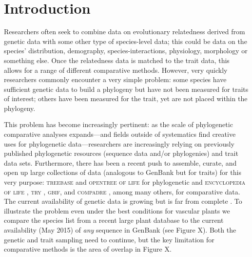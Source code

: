 \documentclass[a4paper,11pt]{article}
\begin{document}
\vfill

\newpage

\section{Introduction}
Researchers often seek to combine data on evolutionary relatedness derived from genetic data with some other type of species-level data; this could be data on the species' distribution, demography, species-interactions, physiology, morphology or something else.    Once the relatedness data is matched to the trait data, this allows for a range of different comparative methods.  However, very quickly researchers commonly encounter a very simple problem: some species have sufficient genetic data to build a phylogeny but have not been measured for traits of interest; others have been measured for the trait, yet are not placed within the phylogeny. 

This problem has become increasingly pertinent: as the scale of phylogenetic comparative analyses expands---and fields outside of systematics find creative uses for phylogenetic data---researchers are increasingly relying on previously published phylogenetic resources (sequence data and/or phylogenies) and trait data sets. Furthermore,  there has been a recent push to assemble, curate, and open up large collections of data (analogous to GenBank but for traits) for this very purpose: \textsc{treebase} \citep{treebase} and \textsc{opentree of life} \citep{OpenTree} for phylogenetic and \textsc{encyclopedia of life} \citep{eol}, \textsc{try} \citep{try}, \textsc{gbif}, and \textsc{compadre} \citep{salguero2015}, among many others, for comparative data.  The current availability of genetic data is growing but is far from complete \citep{hinchliff2014}.  To illustrate the problem even under the best conditions for vascular plants we compare the species list from a recent large plant database \citep{zanne} to the current availability (May 2015) of \emph{any} sequence in GenBank (see Figure X).  Both the genetic and trait sampling need to continue, but the key limitation for comparative methods is the area of overlap in Figure X.  
\end{document}
